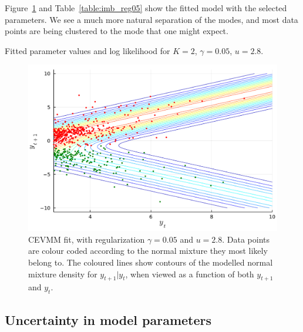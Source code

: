 \documentclass[11pt,twoside,openany]{book}
\numberwithin{Theorem}{chapter}
\numberwithin{Definition}{chapter}
\numberwithin{Lemma}{chapter}
\numberwithin{Algorithm}{chapter}
\numberwithin{equation}{chapter}
\begin{document}
Figure~\ref{fig:imb_contour_with_reg05} and Table~\ref{table:imb_reg05} show
the fitted model with the selected parameters. We see a much more natural separation
of the modes, and most data points are being clustered to the mode that one might expect.


\begin{table}[htp] \centering
   \caption{Fitted parameter values and log
  likelihood for $K=2$, $\gamma=0.05$, $u=2.8$.\label{table:imb_reg05}}
\end{table}

\begin{figure}[htp]
  \centering
  \includegraphics[scale=0.75]{../elexon/figures/imbalance_contour_with_reg05.pdf}
  \caption{CEVMM fit, with regularization $\gamma=0.05$ and $u=2.8$. Data points are colour coded according to the normal mixture they most likely belong to. The coloured
    lines show contours of the modelled normal mixture density
    for $y_{t+1}|y_{t}$, when viewed as a function of both $y_{t+1}$ and $y_{t}$.}\label{fig:imb_contour_with_reg05}
\end{figure}

\subsection{Uncertainty in model parameters}
\end{document}

